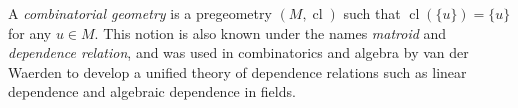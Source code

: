 A \emph{combinatorial geometry} is a pregeometry $(M, \operatorname{cl})$ such that $\operatorname{cl}(\{u\}) = \{u\}$ for any $u \in M$. This notion is also known under the names \emph{matroid} and \emph{dependence relation}, and was used in combinatorics and algebra by van der Waerden to develop a unified theory of dependence relations such as linear dependence and algebraic dependence in fields.
